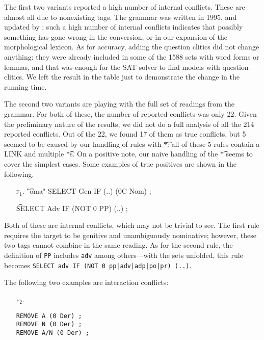 {{The first two variants reported a high number of internal conflicts.
These are almost all due to nonexisting tags. The grammar was written in 1995, and updated by \cite{pirinen2015}; such a high number of internal conflicts indicates that possibly something has gone wrong in the conversion, or in our expansion of the morphological lexicon.
As for accuracy, adding the question clitics did not change anything: they were already included in some of the 1588 sets with word forms or lemmas, and that was enough for the SAT-solver to find models with question clitics.
We left the result in the table just to demonstrate the change in the running time.


The second two variants are playing with the full set of readings from the grammar. For both of these, the number of reported conflicts was only 22.
Given the preliminary nature of the results, we did not do a full analysis of all the 214 reported conflicts.
Out of the 22, we found 17 of them as true conflicts,
 but 5 seemed to be caused by our handling of rules with \t{*}: all of these 5 rules contain a LINK and multiple \t{*}s. On a positive note, our naive handling of the \t{*} seems to cover the simplest cases.
Some examples of true positives are shown in the following.


\begin{itemize}
\item[\textsc{f$_1$}.]\t{"oma" SELECT Gen IF (..) (0C Nom) ;}

\item[] \t{SELECT Adv IF (NOT 0 PP) (..) ;}
\end{itemize}

Both of these are internal conflicts, which may not be trivial to see.
The first rule requires the target to be genitive and unambiguously nominative; however, these two tags cannot combine in the same reading.
As for the second rule, the definition of \texttt{PP} includes \texttt{adv} among others---with the sets unfolded, this rule becomes \texttt{SELECT~adv~IF~(NOT~0~pp|adv|adp|po|pr)~(..)}.

The following two examples are interaction conflicts:

\begin{itemize}
\item[\textsc{f$_2$}.]\begin{verbatim}
REMOVE A (0 Der) ;
REMOVE N (0 Der) ;
REMOVE A/N (0 Der) ;
\end{verbatim}
\end{itemize}

}}
